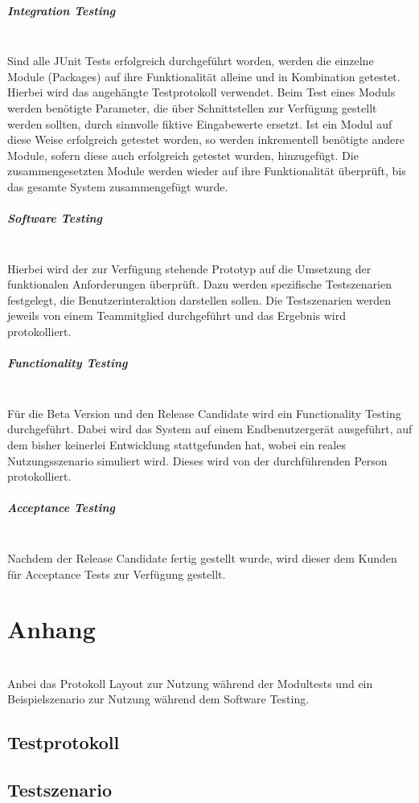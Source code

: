 \documentclass[10pt,a4paper]{article}
\begin{document}
\subparagraph{Integration Testing}\ \\
Sind alle JUnit Tests erfolgreich durchgeführt worden, werden die einzelne Module (Packages) auf ihre Funktionalität alleine und in Kombination getestet. Hierbei wird das angehängte Testprotokoll verwendet. Beim Test eines Moduls werden benötigte Parameter, die über Schnittstellen zur Verfügung gestellt werden sollten, durch sinnvolle fiktive Eingabewerte ersetzt. Ist ein Modul auf diese Weise erfolgreich getestet worden, so werden inkrementell benötigte andere Module, sofern diese auch erfolgreich getestet wurden, hinzugefügt. Die zusammengesetzten Module werden wieder auf ihre Funktionalität überprüft, bis das gesamte System zusammengefügt wurde.

\subparagraph{Software Testing}\ \\
Hierbei wird der zur Verfügung stehende Prototyp auf die Umsetzung der funktionalen Anforderungen überprüft. Dazu werden spezifische Testszenarien festgelegt, die Benutzerinteraktion darstellen sollen. Die Testszenarien werden jeweils von einem Teammitglied durchgeführt und das Ergebnis wird protokolliert. 

\subparagraph{Functionality Testing}\ \\
Für die Beta Version und den Release Candidate wird ein Functionality Testing durchgeführt. Dabei wird das System auf einem Endbenutzergerät ausgeführt, auf dem bisher keinerlei Entwicklung stattgefunden hat, wobei ein reales Nutzungsszenario simuliert wird. Dieses wird von der durchführenden Person protokolliert.

\subparagraph{Acceptance Testing}\ \\
Nachdem der Release Candidate fertig gestellt wurde, wird dieser dem Kunden für Acceptance Tests zur Verfügung gestellt. 

\section{Anhang} \ \\

Anbei das Protokoll Layout zur Nutzung während der Modultests und ein Beispielszenario zur Nutzung während dem Software Testing.\\
\newpage
\subsection{Testprotokoll}

\newpage
\subsection{Testszenario}

\end{document}
